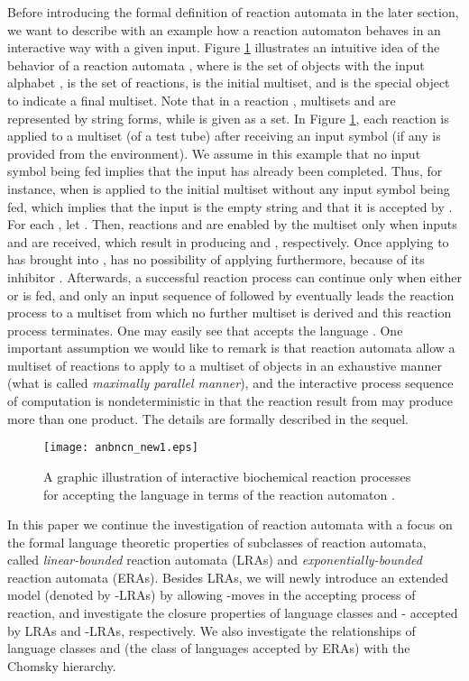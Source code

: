 \documentclass[preprint,fleqn,1p]{elsarticle}
\begin{document}
Before introducing the formal definition of reaction automata in the later  section, we want to describe with an example how a reaction automaton behaves in an interactive way with a given input.  
Figure \ref{graphic} illustrates an intuitive idea of the behavior of a reaction automata , where 
  is the set of objects with the input alphabet , 
 is the set of reactions, 
  is the initial multiset, and  is the special object to indicate a final multiset. 
Note that in a reaction , multisets  and  are  represented by string forms, while  is given as a set.  
In  Figure \ref{graphic},  each reaction  
is applied to a multiset (of a test tube) after receiving an input symbol (if any is provided from the environment). We assume in this example that no input symbol being fed implies that the input has already been completed. Thus, for instance, when  is applied to the initial multiset  without any input symbol being fed, which implies that 
the input is the empty string  and that it is  accepted by . For each , let . Then,  reactions  and  are enabled by the multiset  only when inputs  and  are received,  which result in producing  and , respectively.   
Once applying  to  has brought  into ,  has no possibility of applying  furthermore, because of its inhibitor .  Afterwards, a successful reaction process can continue only when either  or  is fed, and only an input sequence of  followed by  
eventually leads the reaction process to a multiset  from which no further multiset is derived and this reaction process terminates. 
One may easily see that  accepts the language . One important assumption we would like to remark is that reaction automata allow a multiset of reactions  to apply to a multiset of objects  in an exhaustive manner (what is called  {\it maximally parallel manner}),  and  the interactive process sequence of computation is nondeterministic in that the reaction result from   may produce more than one product. The details are formally described in the sequel.

\begin{figure}[t]
\centerline{
\texttt{[image: anbncn\_new1.eps]}}
\caption{A graphic illustration of interactive biochemical reaction processes for accepting  the language  in terms of the reaction automaton  . }
\label{graphic}
\end{figure}

In this paper we  continue the  investigation of reaction automata   
with a  focus on the formal language theoretic properties of subclasses of reaction automata, called {\it linear-bounded} reaction automata (LRAs) and {\it exponentially-bounded} reaction automata (ERAs).  Besides LRAs, we will newly introduce an extended model 
(denoted by -LRAs) by allowing -moves in the accepting process of reaction, and investigate the closure properties of language classes   and - 
accepted by  LRAs and -LRAs, respectively.  
 We also investigate the relationships of language classes 
  and  (the class of languages accepted by ERAs) with the Chomsky hierarchy. 
\end{document}
